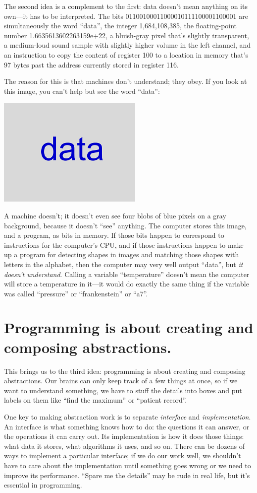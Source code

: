 \documentclass[10pt,letterpaper]{article}
\newcommand{\rulemajor}[1]{\section{#1}}
\begin{document}
The second idea is a complement to the first: data doesn't mean anything on its
own---it has to be interpreted.  The bits 01100100011000010111100001100001 are
simultaneously the word ``data'', the integer 1,684,108,385, the floating-point
number 1.6635613602263159e+22, a bluish-gray pixel that's slightly transparent,
a medium-loud sound sample with slightly higher volume in the left channel, and
an instruction to copy the content of register 100 to a location in memory
that's 97 bytes past the address currently stored in register 116.

The reason for this is that machines don't understand; they obey.  If you look
at this image, you can't help but see the word ``data'':

\includegraphics{data.png}

A machine doesn't; it doesn't even see four blobs of blue pixels on a gray
background, because it doesn't ``see'' anything.  The computer stores this
image, and a program, as bits in memory.  If those bits happen to correspond to
instructions for the computer's CPU, and if those instructions happen to make up
a program for detecting shapes in images and matching those shapes with letters
in the alphabet, then the computer may very well output ``data'', but \emph{it
  doesn't understand}.  Calling a variable ``temperature'' doesn't mean the
computer will store a temperature in it—it would do exactly the same thing if
the variable was called ``pressure'' or ``frankenstein'' or ``a7''.

\rulemajor{Programming is about creating and composing abstractions.}

This brings us to the third idea: programming is about creating and composing
abstractions.  Our brains can only keep track of a few things at once, so if we
want to understand something, we have to stuff the details into boxes and put
labels on them like ``find the maximum'' or ``patient record''.

One key to making abstraction work is to separate \emph{interface} and
\emph{implementation}.  An interface is what something knows how to do: the
questions it can answer, or the operations it can carry out. Its implementation
is how it does those things: what data it stores, what algorithms it uses, and
so on.  There can be dozens of ways to implement a particular interface; if we
do our work well, we shouldn't have to care about the implementation until
something goes wrong or we need to improve its performance.  ``Spare me the
details'' may be rude in real life, but it's essential in programming.
\end{document}
